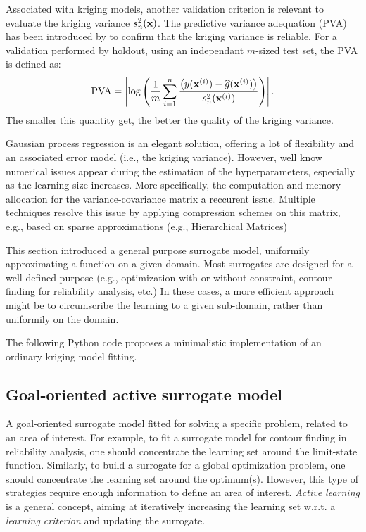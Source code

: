 Associated with kriging models, another validation criterion is relevant to evaluate the kriging variance $s_n^2({\bf x})$. 
The predictive variance adequation (PVA) has been introduced by \citet{bachoc_2013} to confirm that the kriging variance is reliable.
For a validation performed by holdout, using an independant $m$-sized test set, the PVA is defined as: 
\begin{equation}
    \mathrm{PVA} = \left| \log\left( \frac1m \sum_{i=1}^{n} \frac{\left(y({\bf x}^{(i)}) - \widehat{g}({\bf x}^{(i)})\right)}{s_n^2({\bf x}^{(i)})}\right) \right|.
\end{equation}
The smaller this quantity get, the better the quality of the kriging variance. 

Gaussian process regression is an elegant solution, offering a lot of flexibility and an associated error model (i.e., the kriging variance). 
However, well know numerical issues appear during the estimation of the hyperparameters, especially as the learning size increases. 
More specifically, the computation and memory allocation for the variance-covariance matrix a reccurent issue. 
Multiple techniques resolve this issue by applying compression schemes on this matrix, e.g., based on sparse approximations (e.g., Hierarchical Matrices)

This section introduced a general purpose surrogate model, uniformily approximating a function on a given domain. 
Most surrogates are designed for a well-defined purpose (e.g., optimization with or without constraint, contour finding for reliability analysis, etc.)
In these cases, a more efficient approach might be to circumscribe the learning to a given sub-domain, rather than uniformily on the domain. 

\begin{otexample}
    The following Python code proposes a minimalistic \ot implementation of an ordinary kriging model fitting. 
\end{otexample}



\subsection{Goal-oriented active surrogate model}

A goal-oriented surrogate model fitted for solving a specific problem, related to an area of interest. 
For example, to fit a surrogate model for contour finding in reliability analysis, one should concentrate the learning set around the limit-state function. 
Similarly, to build a surrogate for a global optimization problem, one should concentrate the learning set around the optimum(s).
However, this type of strategies require enough information to define an area of interest. 
\textit{Active learning} is a general concept, aiming at iteratively increasing the learning set w.r.t. a \textit{learning criterion} and updating the surrogate. 

